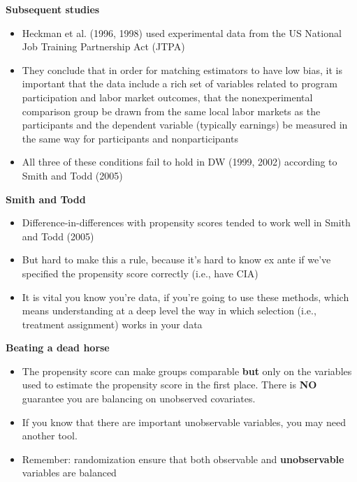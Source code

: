 \documentclass[notes=show]{beamer}
\begin{document}
\begin{frame}[plain]
\begin{center}
\textbf{Subsequent studies}
\end{center}

\begin{itemize}
\item Heckman et al. (1996, 1998) used experimental data from the US National Job Training Partnership Act (JTPA)
\item They conclude that in order for matching estimators to have low bias, it is important that the data include a rich set of variables related to program participation and labor market outcomes, that the nonexperimental comparison group be drawn from the same local labor markets as the participants and the dependent variable (typically earnings) be measured in the same way for participants and nonparticipants
\item All three of these conditions fail to hold in DW (1999, 2002) according to Smith and Todd (2005)
\end{itemize}

\end{frame}


\begin{frame}[plain]
\begin{center}
\textbf{Smith and Todd}
\end{center}

\begin{itemize}
\item Difference-in-differences with propensity scores tended to work well in Smith and Todd (2005)
\item But hard to make this a rule, because it's hard to know ex ante if we've specified the propensity score correctly (i.e., have CIA)
\item It is vital you know you're data, if you're going to use these methods, which means understanding at a deep level the way in which selection (i.e., treatment assignment) works in your data
\end{itemize}

\end{frame}
\begin{frame}[plain]
\begin{center}
\textbf{Beating a dead horse}
\end{center}

\begin{itemize}
	\item The propensity score can make groups comparable \textbf{but} only on the variables used to estimate the propensity score in the first place.  There is \textbf{NO} guarantee you are balancing on unobserved covariates.
	\item If you know that there are important unobservable variables, you may need another tool.
	\item Remember: randomization ensure that both observable and \textbf{unobservable} variables are balanced
\end{itemize}
\end{frame}
\end{document}
